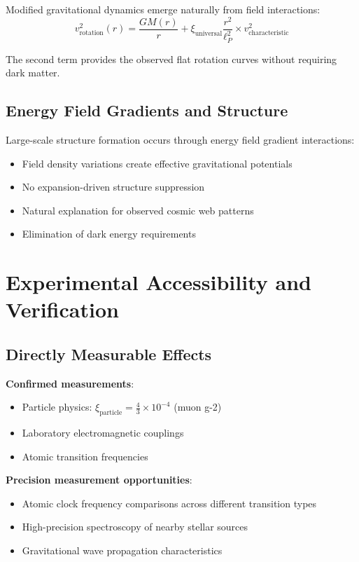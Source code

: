 \documentclass[12pt,a4paper]{article}
\begin{document}
	Modified gravitational dynamics emerge naturally from field interactions:
	\begin{equation}
		v_{\text{rotation}}^2(r) = \frac{GM(r)}{r} + \xi_{\text{universal}} \frac{r^2}{\ell_P^2} \times v_{\text{characteristic}}^2
	\end{equation}
	
	The second term provides the observed flat rotation curves without requiring dark matter.
	
	\subsection{Energy Field Gradients and Structure}
	\label{subsec:field_gradients}
	
	Large-scale structure formation occurs through energy field gradient interactions:
	\begin{itemize}
		\item Field density variations create effective gravitational potentials
		\item No expansion-driven structure suppression
		\item Natural explanation for observed cosmic web patterns
		\item Elimination of dark energy requirements
	\end{itemize}
	
	\section{Experimental Accessibility and Verification}
	\label{sec:experimental_verification}
	
	\subsection{Directly Measurable Effects}
	\label{subsec:directly_measurable}
	
	\textbf{Confirmed measurements}:
	\begin{itemize}
		\item Particle physics: $\xi_{\text{particle}} = \frac{4}{3} \times 10^{-4}$ (muon g-2)
		\item Laboratory electromagnetic couplings
		\item Atomic transition frequencies
	\end{itemize}
	
	\textbf{Precision measurement opportunities}:
	\begin{itemize}
		\item Atomic clock frequency comparisons across different transition types
		\item High-precision spectroscopy of nearby stellar sources
		\item Gravitational wave propagation characteristics
	\end{itemize}
	
\end{document}
